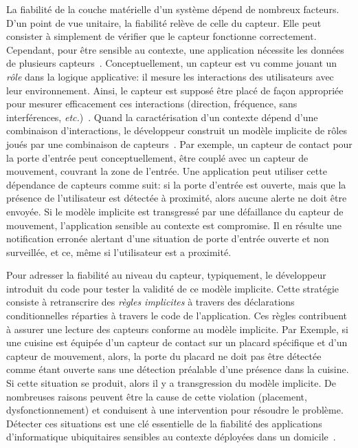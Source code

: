 La fiabilité de la couche matérielle d'un système dépend de nombreux facteurs. D'un point de vue unitaire, la fiabilité relève de celle du capteur. 
Elle peut consister à simplement de vérifier que le capteur fonctionne correctement. Cependant, pour être sensible au contexte, 
une application nécessite les données de plusieurs capteurs~\cite{STANKOVIC-OPPORTUNITIES-COMPUTER2005}. Conceptuellement, un capteur est vu comme jouant un {\em rôle} dans la logique applicative: il mesure les interactions des utilisateurs avec leur environnement. Ainsi, le capteur est supposé être placé de façon appropriée pour mesurer efficacement ces interactions (direction, fréquence, sans interférences, {\em etc.})~\cite{EDWARD-ATHOME-UBICOMP2001}. Quand la caractérisation d'un contexte dépend d'une combinaison d'interactions, le développeur construit un modèle implicite de rôles %
joués par une combinaison de capteurs~\cite{HENRICKSEN-MODELING-PERVASIVE2002}. Par exemple, un capteur de contact pour la porte d'entrée peut conceptuellement, être couplé avec un capteur de mouvement, couvrant la zone de l'entrée. Une application peut utiliser cette dépendance de capteurs comme suit: si la porte d'entrée est ouverte, mais que la présence de l'utilisateur est détectée à proximité, alors aucune alerte ne doit être envoyée. Si le modèle implicite est transgressé par une défaillance du capteur de mouvement, l'application sensible au contexte est compromise. Il en résulte une notification erronée alertant d'une situation de porte d'entrée ouverte et non surveillée, et ce, même si l'utilisateur est a proximité.

Pour adresser la fiabilité au niveau du capteur, typiquement, le développeur introduit du code pour tester la validité de ce modèle implicite. Cette stratégie consiste à retranscrire des {\em règles implicites} à travers des déclarations conditionnelles réparties à travers le code de l'application. Ces règles contribuent à assurer une lecture des capteurs conforme au modèle implicite. Par Exemple, si une cuisine est équipée d'un capteur de contact sur un placard spécifique et d'un capteur de mouvement, alors, la porte du placard ne doit pas être détectée comme étant ouverte sans une détection préalable d'une présence dans la cuisine. Si cette situation se produit, alors il y a transgression du modèle implicite. De nombreuses raisons peuvent être la cause de cette violation (placement, dysfonctionnement) et conduisent à une intervention pour résoudre le problème. Détecter ces situations est une clé essentielle de la fiabilité des applications d'informatique ubiquitaires sensibles au contexte déployées dans un domicile~\cite{BECKMANN-SOME-UBICOMP2004}.
 

